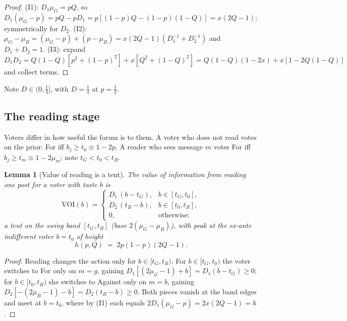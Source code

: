 \documentclass[12pt]{article}
\newtheorem{lemma}{Lemma}
\begin{document}
\begin{proof}
(I1): $D_1\mu_G=pQ$, so $D_1(\mu_G-p)=pQ-pD_1=p[(1-p)Q-(1-p)(1-Q)]=x(2Q-1)$;
symmetrically for $D_2$. (I2): $\mu_G-\mu_B=(\mu_G-p)+(p-\mu_B)
=x(2Q-1)(D_1^{-1}+D_2^{-1})$ and $D_1+D_2=1$. (I3): expand
$D_1D_2=Q(1-Q)[p^2+(1-p)^2]+x[Q^2+(1-Q)^2]=Q(1-Q)(1-2x)+x[1-2Q(1-Q)]$ and
collect terms.
\end{proof}

Note $D\in(0,\tfrac14]$, with $D=\tfrac14$ at $p=\tfrac12$.

\subsection{The reading stage}
\label{app:sec:read}

Voters differ in how useful the forum is to them. A voter who does not read
votes on the prior: For iff $b_j\ge t_0\equiv 1-2p$. A reader who sees message
$m$ votes For iff $b_j\ge t_m\equiv 1-2\mu_m$; note $t_G<t_0<t_B$.

\begin{lemma}[Value of reading is a tent]\label{app:lem:tent}
The value of information from reading one post for a voter with taste $b$ is
\[
\mathrm{VOI}(b)=
\begin{cases}
D_1\,(b-t_G), & b\in[t_G,t_0],\\[2pt]
D_2\,(t_B-b), & b\in[t_0,t_B],\\[2pt]
0,& \text{otherwise:}
\end{cases}
\]
a tent on the swing band $[t_G,t_B]$ (base $2(\mu_G-\mu_B)$), with peak at the
ex-ante indifferent voter $b=t_0$ of height
\begin{equation}\label{app:eq:peak}
h(p,Q)\;=\;2p(1-p)(2Q-1).
\end{equation}
\end{lemma}

\begin{proof}
Reading changes the action only for $b\in[t_G,t_B)$. For $b\in[t_G,t_0)$ the
voter switches to For only on $m=g$, gaining $D_1[(2\mu_G-1)+b]=D_1(b-t_G)\ge0$;
for $b\in[t_0,t_B)$ she switches to Against only on $m=b$, gaining
$D_2[-(2\mu_B-1)-b]=D_2(t_B-b)\ge0$. Both pieces vanish at the band edges and
meet at $b=t_0$, where by (I1) each equals $2D_1(\mu_G-p)=2x(2Q-1)=h$.
\end{proof}
\end{document}
